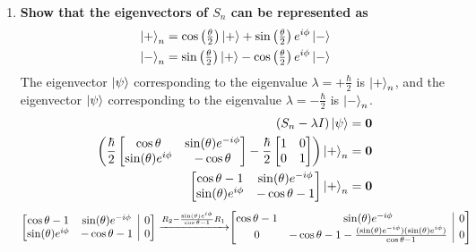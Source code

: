 \documentclass[11pt]{article}
\makeatletter
\newenvironment{amatrix}[1]{%
    \left[\begin{array}{@{}*{#1}{c}|c@{}}
}{%
    \end{array}\right]
}
\makeatother
\begin{document}
\begin{enumerate}[label=\textbf{\arabic*.}]
{\begin{enumerate}[label=\textbf{(\alph*)}]
{\begin{align*}
                        \lambda&=\pm\frac \hbar 2
                    \end{align*}
                }
                \item{
                    \textbf{\boldmath Show that the eigenvectors of \(S_n\) can be represented as \begin{gather*}\ket{+}_n=\cos\left(\tfrac \theta 2\right)\ket{+}+\sin\left(\tfrac \theta 2\right)e^{i\phi}\ket{-} \\ \ket{-}_n=\sin\left(\tfrac \theta 2\right)\ket{+}-\cos\left(\tfrac \theta 2\right)e^{i\phi}\ket{-}\end{gather*}}%
                    The eigenvector \(\ket \psi\) corresponding to the eigenvalue \(\lambda=+\frac \hbar 2\) is \(\ket{+}_n\), and the eigenvector \(\ket \psi\) corresponding to the eigenvalue \(\lambda=-\frac \hbar 2\) is \(\ket{-}_n\).
                    \begin{align*}
                        (S_n-\lambda I)\ket{\psi}&=\mathbf{0} \\
                        \left(\frac \hbar 2 \begin{bmatrix}\cos\theta & \sin(\theta)e^{-i\phi} \\ \sin(\theta)e^{i\phi} & -\cos\theta\end{bmatrix}-\frac \hbar 2 \begin{bmatrix}1 & 0 \\ 0 & 1\end{bmatrix}\right)\ket{+}_n&=\mathbf{0} \\
                        \begin{bmatrix}\cos\theta-1 & \sin(\theta)e^{-i\phi} \\ \sin(\theta)e^{i\phi} & -\cos\theta-1\end{bmatrix}\ket{+}_n&=\mathbf{0}
                    \end{align*}
                    \begin{align*}
                        \begin{amatrix}{2}\cos\theta-1 & \sin(\theta)e^{-i\phi} & 0 \\ \sin(\theta)e^{i\phi} & -\cos\theta-1 & 0\end{amatrix}
                        \xrightarrow{R_2-\frac{\sin(\theta)e^{i\phi}}{\cos\theta-1}R_1}
                        &\begin{amatrix}{2}\cos\theta-1 & \sin(\theta)e^{-i\phi} & 0 \\ 0 & -\cos\theta-1-\frac{(\sin(\theta)e^{-i\phi})(\sin(\theta)e^{i\phi})}{\cos\theta-1} & 0\end{amatrix} \\

\end{align*}}
\end{enumerate}}
\end{enumerate}
\end{document}
